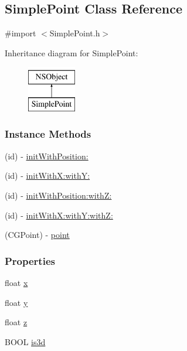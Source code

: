 \hypertarget{interface_simple_point}{\subsection{Simple\-Point Class Reference}
\label{d9/dc7/interface_simple_point}
}


{\ttfamily \#import $<$Simple\-Point.\-h$>$}

Inheritance diagram for Simple\-Point\-:\begin{figure}[H]
\begin{center}
\leavevmode
\includegraphics[height=2.000000cm]{d9/dc7/interface_simple_point}
\end{center}
\end{figure}
\subsubsection*{Instance Methods}
\begin{DoxyCompactItemize}
\item 
(id) -\/ \hyperlink{interface_simple_point_aa138ca80c0a7a5fa1684c38483042a76}{init\-With\-Position\-:}
\item 
(id) -\/ \hyperlink{interface_simple_point_a9ded444176a17c3ff2c398c17e6c7c74}{init\-With\-X\-:with\-Y\-:}
\item 
(id) -\/ \hyperlink{interface_simple_point_a24776a0473601bcdf437ba02dbc89d5c}{init\-With\-Position\-:with\-Z\-:}
\item 
(id) -\/ \hyperlink{interface_simple_point_afb23073d7d7146f85e0dec2029c962d0}{init\-With\-X\-:with\-Y\-:with\-Z\-:}
\item 
(C\-G\-Point) -\/ \hyperlink{interface_simple_point_a2f2ec1990349aa281ea9003c2d7e320b}{point}
\end{DoxyCompactItemize}
\subsubsection*{Properties}
\begin{DoxyCompactItemize}
\item 
float \hyperlink{interface_simple_point_abb16aaf6215e9e946606b30199b1c3af}{x}
\item 
float \hyperlink{interface_simple_point_ae10ba2c5156e6061258a0720443cd1c8}{y}
\item 
float \hyperlink{interface_simple_point_ad74ae8e5d653579e791c040155e7d4d6}{z}
\item 
B\-O\-O\-L \hyperlink{interface_simple_point_ad56fae41f389d3c12b4023c3e797f452}{is3d}
\end{DoxyCompactItemize}


